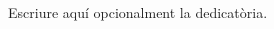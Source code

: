 \documentclass[a4paper,12pt,spanish,final]{epsc_tfc_pfc}
\begin{document}
\pagestyle{empty}
\portada{}


\begin{resum}{15cm}
\end{resum}


\begin{overview}{15cm}
\end{overview}



\begin{dedicatoria}
Escriure aquí opcionalment la dedicatòria.
\end{dedicatoria}


\thispagestyle{empty}
\tableofcontents
\cleardoublepage{}
\thispagestyle{empty}
\listoffigures
\cleardoublepage{}
\thispagestyle{empty}
\listoftables
\cleardoublepage{}
\pagestyle{fancy}

\end{document}
